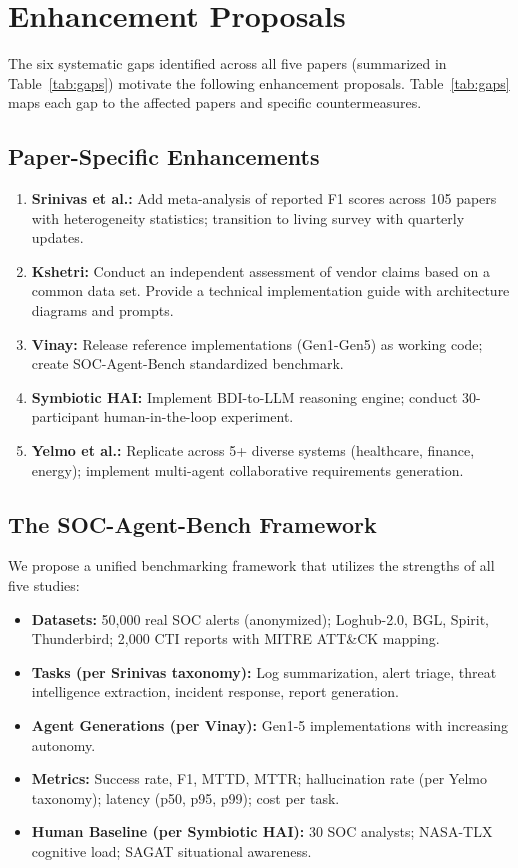 \documentclass[journal]{IEEEtran}
\begin{document}
\section{Enhancement Proposals}
The six systematic gaps identified across all five papers (summarized in Table~\ref{tab:gaps}) motivate the following enhancement proposals. Table~\ref{tab:gaps} maps each gap to the affected papers and specific countermeasures.

\subsection{Paper-Specific Enhancements}
\begin{enumerate}
    \item \textbf{Srinivas et al.:} Add meta-analysis of reported F1 scores across 105 papers with heterogeneity statistics; transition to living survey with quarterly updates.
    \item \textbf{Kshetri:} Conduct an independent assessment of vendor claims based on a common data set. Provide a technical implementation guide with architecture diagrams and prompts.
    \item \textbf{Vinay:} Release reference implementations (Gen1-Gen5) as working code; create SOC-Agent-Bench standardized benchmark.
    \item \textbf{Symbiotic HAI:} Implement BDI-to-LLM reasoning engine; conduct 30-participant human-in-the-loop experiment.
    \item \textbf{Yelmo et al.:} Replicate across 5+ diverse systems (healthcare, finance, energy); implement multi-agent collaborative requirements generation.
\end{enumerate}

\subsection{The SOC-Agent-Bench Framework}
We propose a unified benchmarking framework that utilizes the strengths of all five studies:

\begin{itemize}
    \item \textbf{Datasets:} 50,000 real SOC alerts (anonymized); Loghub-2.0, BGL, Spirit, Thunderbird; 2,000 CTI reports with MITRE ATT\&CK mapping.
    \item \textbf{Tasks (per Srinivas taxonomy):} Log summarization, alert triage, threat intelligence extraction, incident response, report generation.
    \item \textbf{Agent Generations (per Vinay):} Gen1-5 implementations with increasing autonomy.
    \item \textbf{Metrics:} Success rate, F1, MTTD, MTTR; hallucination rate (per Yelmo taxonomy); latency (p50, p95, p99); cost per task.
    \item \textbf{Human Baseline (per Symbiotic HAI):} 30 SOC analysts; NASA-TLX cognitive load; SAGAT situational awareness.
\end{itemize}
\end{document}
